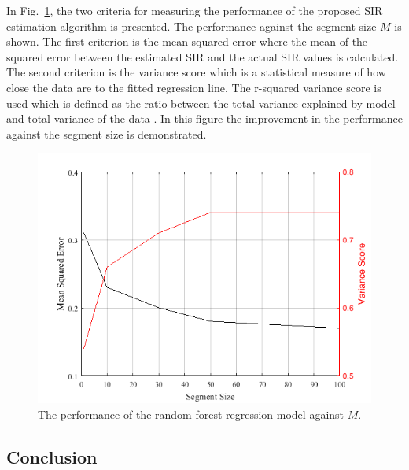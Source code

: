 In Fig.~\ref{ftml-conf:fig:prediction-error}, the two criteria for measuring the performance of the proposed SIR estimation algorithm is presented. The performance against the segment size $M$ is shown. The first criterion is the mean squared error where the mean of the squared error between the estimated SIR and the actual SIR values is calculated. The second criterion is the variance score which is a statistical measure of how close the data are to the fitted regression line. The r-squared variance score is used which is defined as the ratio between the total variance explained by model and total variance of the data \cite{r-squared}. In this figure the improvement in the performance against the segment size is demonstrated. 

\begin{figure}[tbp]
 \centering
 \includegraphics[width=0.75\columnwidth]{./chapter-ftml/plots/prediction-error}
 \caption{The performance of the random forest regression model against $M$.}
 \label{ftml-conf:fig:prediction-error}
\end{figure}

\subsection{Conclusion}\label{ftml-conf:sec:conclusion}

